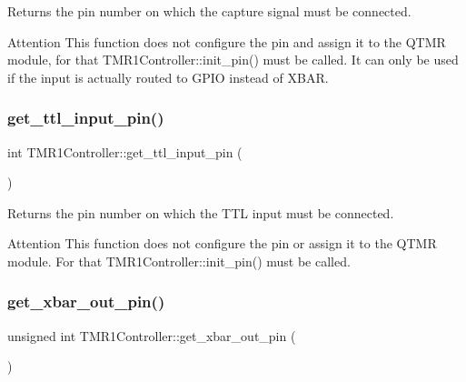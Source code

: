 Returns the pin number on which the capture signal must be connected. 

\begin{DoxyAttention}{Attention}
This function does not configure the pin and assign it to the Q\+T\+MR module, for that T\+M\+R1\+Controller\+::init\+\_\+pin() must be called. It can only be used if the input is actually routed to G\+P\+IO instead of X\+B\+AR. 
\end{DoxyAttention}
\mbox{\label{classTMR1Controller_a084c153e1a888f72456c54b29e3fa957}} 
\subsubsection{\texorpdfstring{get\+\_\+ttl\+\_\+input\+\_\+pin()}{get\_ttl\_input\_pin()}}
{\footnotesize\ttfamily int T\+M\+R1\+Controller\+::get\+\_\+ttl\+\_\+input\+\_\+pin (\begin{DoxyParamCaption}{ }\end{DoxyParamCaption})\hspace{0.3cm}{\ttfamily [inline]}}



Returns the pin number on which the T\+TL input must be connected. 

\begin{DoxyAttention}{Attention}
This function does not configure the pin or assign it to the Q\+T\+MR module. For that T\+M\+R1\+Controller\+::init\+\_\+pin() must be called. 
\end{DoxyAttention}
\mbox{\label{classTMR1Controller_a5b2f74d17a84db6a9c2957b75d79ab98}} 
\subsubsection{\texorpdfstring{get\+\_\+xbar\+\_\+out\+\_\+pin()}{get\_xbar\_out\_pin()}}
{\footnotesize\ttfamily unsigned int T\+M\+R1\+Controller\+::get\+\_\+xbar\+\_\+out\+\_\+pin (\begin{DoxyParamCaption}{ }\end{DoxyParamCaption})\hspace{0.3cm}{\ttfamily [inline]}}



